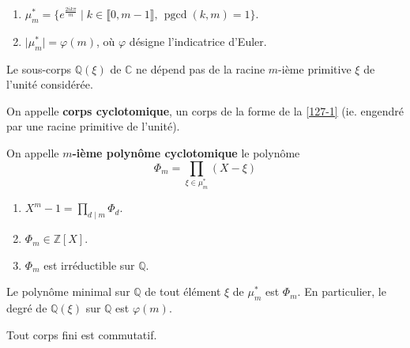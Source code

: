 	\begin{proposition}
		\begin{enumerate}[label=(\roman*)]
			\item $\mu_m^* = \{ e^{\frac{2ik\pi}{m}} \mid k \in \llbracket 0, m-1 \rrbracket, \, \operatorname{pgcd}(k, m) = 1 \}$.
			\item $\vert \mu_m^* \vert = \varphi(m)$, où $\varphi$ désigne l'indicatrice d'Euler.
		\end{enumerate}
	\end{proposition}
	
	\begin{proposition}
		\label{127-1}
		Le sous-corps $\mathbb{Q}(\xi)$ de $\mathbb{C}$ ne dépend pas de la racine $m$-ième primitive $\xi$ de l'unité considérée.
	\end{proposition}
	
	\begin{definition}
		On appelle \textbf{corps cyclotomique}, un corps de la forme de la \cref{127-1} (ie. engendré par une racine primitive de l'unité).
	\end{definition}
	
	\begin{definition}
		On appelle \textbf{$m$-ième polynôme cyclotomique} le polynôme
		\[ \Phi_m = \prod_{\xi \in \mu_m^*} (X - \xi) \]
	\end{definition}
	
	\begin{theorem}
		\begin{enumerate}[label=(\roman*)]
			\item $X^m - 1 = \prod_{d \mid m} \Phi_d$.
			\item $\Phi_m \in \mathbb{Z}[X]$.
			\item $\Phi_m$ est irréductible sur $\mathbb{Q}$.
		\end{enumerate}
	\end{theorem}
	
	\begin{corollary}
		Le polynôme minimal sur $\mathbb{Q}$ de tout élément $\xi$ de $\mu_m^*$ est $\Phi_m$. En particulier, le degré de $\mathbb{Q}(\xi)$ sur $\mathbb{Q}$ est $\varphi(m)$.
	\end{corollary}
	
	\begin{application}
		Tout corps fini est commutatif.
	\end{application}
	
	
